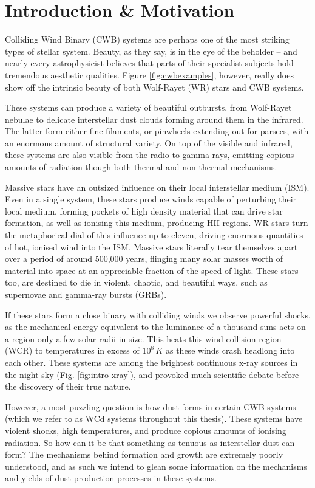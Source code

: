 \chapter{Introduction \& Motivation}

Colliding Wind Binary (CWB) systems are perhaps one of the most striking types of stellar system.
Beauty, as they say, is in the eye of the beholder -- and nearly every astrophysicist believes that parts of their specialist subjects hold tremendous aesthetic qualities.
Figure \ref{fig:cwbexamples}, however, really does show off the intrinsic beauty of both Wolf-Rayet (WR) stars and CWB systems.

These systems can produce a variety of beautiful outbursts, from Wolf-Rayet nebulae to delicate interstellar dust clouds forming around them in the infrared.
The latter form either fine filaments, or pinwheels extending out for parsecs, with an enormous amount of structural variety.
On top of the visible and infrared, these systems are also visible from the radio to gamma rays, emitting copious amounts of radiation though both thermal and non-thermal mechanisms.

Massive stars have an outsized influence on their local interstellar medium (ISM).
Even in a single system, these stars produce winds capable of perturbing their local medium, forming pockets of high density material that can drive star formation, as well as ionising this medium, producing HII regions.
WR stars turn the metaphorical dial of this influence up to eleven, driving enormous quantities of hot, ionised wind into the ISM.
Massive stars literally tear themselves apart over a period of around 500,000 years, flinging many solar masses worth of material into space at an appreciable fraction of the speed of light.
These stars too, are destined to die in violent, chaotic, and beautiful ways, such as supernovae and gamma-ray bursts (GRBs).

If these stars form a close binary with colliding winds we observe powerful shocks, as the mechanical energy equivalent to the luminance of a thousand suns acts on a region only a few solar radii in size.
This heats this wind collision region (WCR) to temperatures in excess of $10^8 \, \si{K}$ as these winds crash headlong into each other.
These systems are among the brightest continuous x-ray sources in the night sky (Fig. \ref{fig:intro-xray}), and provoked much scientific debate before the discovery of their true nature. 

However, a most puzzling question is how dust forms in certain CWB systems (which we refer to as WCd systems throughout this thesis).
These systems have violent shocks, high temperatures, and produce copious amounts of ionising radiation.
So how can it be that something as tenuous as interstellar dust can form?
The mechanisms behind formation and growth are extremely poorly understood, and as such we intend to glean some information on the mechanisms and yields of dust production processes in these systems.

